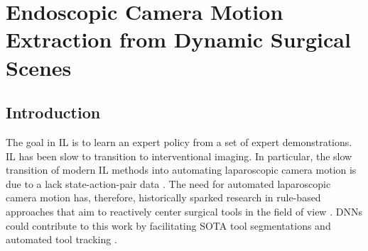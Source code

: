 \graphicspath{{chapter_3}}
\chapter[Camera Motion Estimation]{Endoscopic Camera Motion Extraction from Dynamic Surgical Scenes}
\label{chap:camera_motion_extraction}
\minitoc
\section{Introduction}
The goal in IL is to learn an expert policy from a set of expert demonstrations.
IL has been slow to transition to interventional imaging. In particular, the slow transition of modern IL methods into automating laparoscopic camera motion is due to a lack state-action-pair data \cite{kassahun2016surgical, esteva2019guide}. The need for automated laparoscopic camera motion \cite{pandya2014review, ellis2016task} has, therefore, historically sparked research in rule-based approaches that aim to reactively center surgical tools in the field of view \cite{agustinos2014visual, da2020scan}. DNNs could contribute to this work by facilitating SOTA tool segmentations and automated tool tracking \cite{garcia2017toolnet, garcia2021image, gruijthuijsen2021autonomous}.



